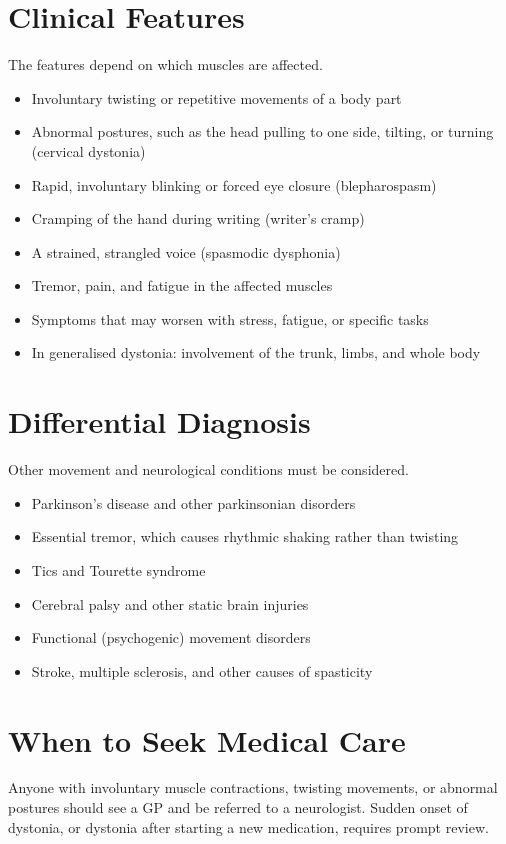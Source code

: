 \section*{Clinical Features}
The features depend on which muscles are affected.
\begin{itemize}
    \item Involuntary twisting or repetitive movements of a body part
    \item Abnormal postures, such as the head pulling to one side, tilting, or turning (cervical dystonia)
    \item Rapid, involuntary blinking or forced eye closure (blepharospasm)
    \item Cramping of the hand during writing (writer's cramp)
    \item A strained, strangled voice (spasmodic dysphonia)
    \item Tremor, pain, and fatigue in the affected muscles
    \item Symptoms that may worsen with stress, fatigue, or specific tasks
    \item In generalised dystonia: involvement of the trunk, limbs, and whole body
\end{itemize}

\section*{Differential Diagnosis}
Other movement and neurological conditions must be considered.
\begin{itemize}
    \item Parkinson's disease and other parkinsonian disorders
    \item Essential tremor, which causes rhythmic shaking rather than twisting
    \item Tics and Tourette syndrome
    \item Cerebral palsy and other static brain injuries
    \item Functional (psychogenic) movement disorders
    \item Stroke, multiple sclerosis, and other causes of spasticity
\end{itemize}

\section*{When to Seek Medical Care}
Anyone with involuntary muscle contractions, twisting movements, or abnormal postures should see a GP and be referred to a neurologist. Sudden onset of dystonia, or dystonia after starting a new medication, requires prompt review.


